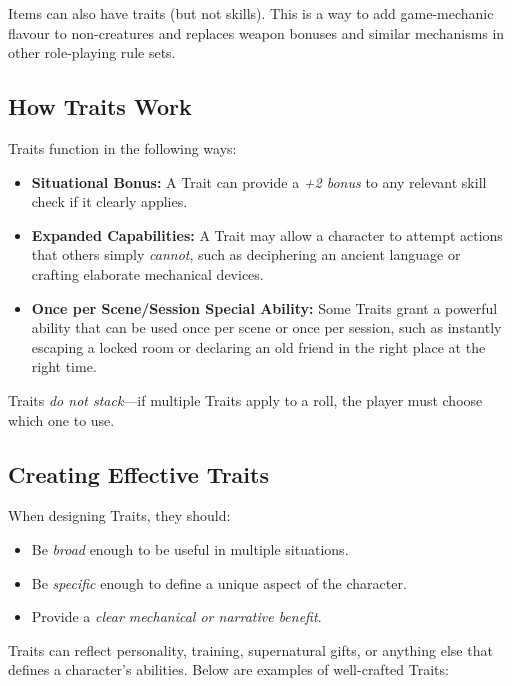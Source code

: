 Items can also have traits (but not skills). This is a way to add game-mechanic flavour to non-creatures and replaces weapon bonuses and similar mechanisms in other role-playing rule sets.

\subsection{How Traits Work}

Traits function in the following ways:

\begin{itemize}
    \item \textbf{Situational Bonus:} A Trait can provide a \emph{+2 bonus} to any relevant skill check if it clearly applies.
    \item \textbf{Expanded Capabilities:} A Trait may allow a character to attempt actions that others simply \emph{cannot}, such as deciphering an ancient language or crafting elaborate mechanical devices.
    \item \textbf{Once per Scene/Session Special Ability:} Some Traits grant a powerful ability that can be used once per scene or once per session, such as instantly escaping a locked room or declaring an old friend in the right place at the right time.
\end{itemize}

Traits \emph{do not stack}—if multiple Traits apply to a roll, the player must choose which one to use.

\subsection{Creating Effective Traits}

When designing Traits, they should:
\begin{itemize}
    \item Be \emph{broad} enough to be useful in multiple situations.
    \item Be \emph{specific} enough to define a unique aspect of the character.
    \item Provide a \emph{clear mechanical or narrative benefit}.
\end{itemize}

Traits can reflect personality, training, supernatural gifts, or anything else that defines a character’s abilities. Below are examples of well-crafted Traits:


